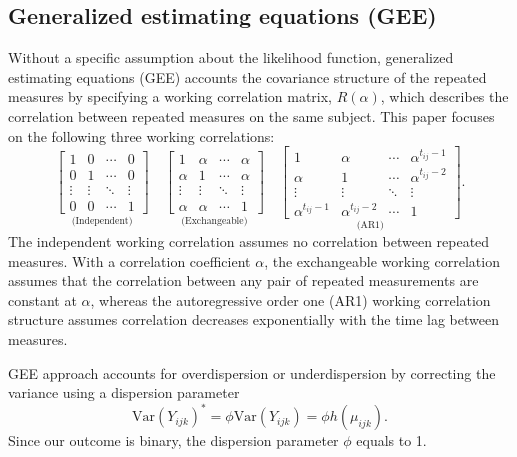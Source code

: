 \documentclass[
]{aft}
\begin{document}
\subsection{Generalized estimating equations
(GEE)}\label{generalized-estimating-equations-gee}

Without a specific assumption about the likelihood function, generalized
estimating equations (GEE) accounts the covariance structure of the
repeated measures by specifying a working correlation matrix,
\(R(\alpha)\), which describes the correlation between repeated measures
on the same subject. This paper focuses on the following three working
correlations: \[
\underset{\text{(Independent)}}{\begin{bmatrix}
1 & 0 & \cdots & 0\\
0 & 1 & \cdots &  0\\
\vdots & \vdots & \ddots & \vdots\\
0 & 0 & \cdots & 1
\end{bmatrix}}
\quad
\underset{\text{(Exchangeable)}}{\begin{bmatrix}
1 & \alpha & \cdots & \alpha\\
\alpha & 1 & \cdots & \alpha\\
\vdots & \vdots & \ddots & \vdots\\
\alpha & \alpha & \cdots & 1
\end{bmatrix}}
\quad
\underset{\text{(AR1)}}{\begin{bmatrix}
1 & \alpha & \cdots & \alpha^{t_{ij} - 1}\\
\alpha & 1 & \cdots & \alpha^{t_{ij} - 2}\\
\vdots & \vdots & \ddots & \vdots\\
\alpha^{t_{ij} - 1} & \alpha^{t_{ij} - 2} & \cdots & 1
\end{bmatrix}}.
\] The independent working correlation assumes no correlation between
repeated measures. With a correlation coefficient \(\alpha\), the
exchangeable working correlation assumes that the correlation between
any pair of repeated measurements are constant at \(\alpha\), whereas
the autoregressive order one (AR1) working correlation structure assumes
correlation decreases exponentially with the time lag between measures.

GEE approach accounts for overdispersion or underdispersion by
correcting the variance using a dispersion parameter \[
\text{Var}(Y_{ijk})^* = \phi\text{Var}(Y_{ijk}) = \phi h(\mu_{ijk}).
\] Since our outcome is binary, the dispersion parameter \(\phi\) equals
to 1.
\end{document}
